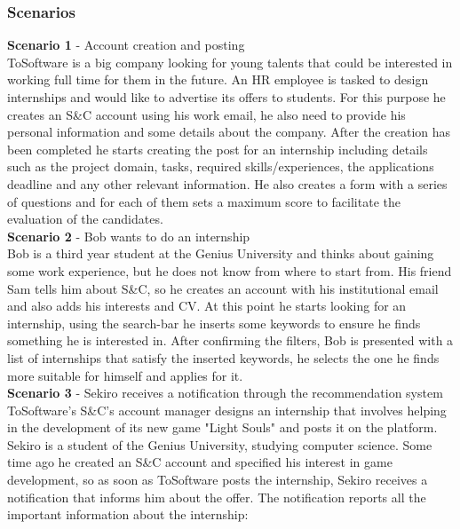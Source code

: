 \documentclass[11pt,twoside]{article}
\begin{document}
		\subsubsection{Scenarios}
\textbf{\large{Scenario 1}} - Account creation and posting \\
ToSoftware is a big company looking for young talents that could be interested in working full time for them in the future. An HR employee is tasked to design internships and would like to advertise its offers to students. For this purpose he creates an S\&C account using his work email, he also need to provide his personal information and some details about the company. After the creation has been completed he starts creating the post for an internship including details such as the project domain, tasks, required skills/experiences, the applications deadline and any other relevant information. He also creates a form with a series of questions and for each of them sets a maximum score to facilitate the evaluation of the candidates.
\vspace{1\baselineskip} \\
\textbf{\large{Scenario 2}} - Bob wants to do an internship \\
Bob is a third year student at the Genius University and thinks about gaining some work experience, but he does not know from where to start from. His friend Sam tells him about S\&C, so he creates an account with his institutional email and also adds his interests and CV. At this point he starts looking for an internship, using the search-bar he inserts some keywords to ensure he finds something he is interested in. After confirming the filters, Bob is presented with a list of internships that satisfy the inserted keywords, he selects the one he finds more suitable for himself and applies for it.
\vspace{1\baselineskip} \\
\textbf{\large{Scenario 3}} - Sekiro receives a notification through the recommendation system \\
ToSoftware's S\&C's account manager designs an internship that involves helping in the development of its new game "Light Souls" and posts it on the platform. Sekiro is a student of the Genius University, studying computer science. Some time ago he created an S\&C account and specified his interest in game development, so as soon as ToSoftware posts the internship, Sekiro receives a notification that informs him about the offer. The notification reports all the important information about the internship:
\end{document}
